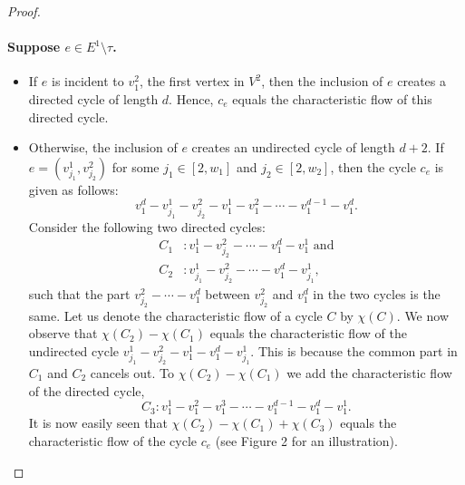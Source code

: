 \begin{proof}
\paragraph{Suppose $e\in E^1\setminus\tau$.}
\begin{itemize}
\item If $e$ is incident to $v^2_1$, the first vertex in $V^2$, then the inclusion of $e$ creates a directed cycle of length $d$. Hence, $c_e$ equals the characteristic flow of this directed cycle.
\item Otherwise, the inclusion of $e$ creates an undirected cycle of length $d+2$. If $e=(v^1_{j_1},v^2_{j_2})$ for some $j_1\in[2,w_1]$ and $j_2\in[2,w_2]$, then the cycle $c_e$ is given as follows:
\[v^d_1-v^1_{j_1}-v^2_{j_2}-v^1_1-v^2_1-\cdots-v^{d-1}_1-v^d_1.\]
Consider the following two directed cycles:
\begin{align*}C_1&:v^1_1-v^2_{j_2}-\cdots-v^d_1-v^1_1\text{ and}\\C_2&:v^1_{j_1}-v^2_{j_2}-\cdots-v^d_1-v^1_{j_1},\end{align*}
such that the part $v^2_{j_2}-\cdots-v^d_1$ between $v^2_{j_2}$ and $v^d_1$ in the two cycles is the same. Let us denote the characteristic flow of a cycle $C$ by $\chi(C)$. We now observe that $\chi(C_2)-\chi(C_1)$ equals the characteristic flow of the undirected cycle $v^1_{j_1}-v^2_{j_2}-v^1_1-v^d_1-v^1_{j_1}$. This is because the common part in $C_1$ and $C_2$ cancels out. To $\chi(C_2)-\chi(C_1)$ we add the characteristic flow of the directed cycle,
\[C_3:v^1_1-v^2_1-v^3_1-\cdots-v^{d-1}_1-v^d_1-v^1_1.\]
It is now easily seen that $\chi(C_2)-\chi(C_1)+\chi(C_3)$ equals the characteristic flow of the cycle $c_e$ (see Figure 2 for an illustration).
\end{itemize}

\end{proof}
